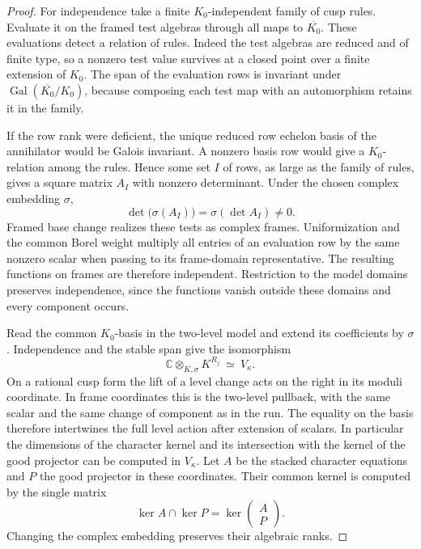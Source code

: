 \begin{proof}
For independence take a finite $K_0$-independent family of
cusp rules. Evaluate it on the framed test algebras through
all maps to $\overline{K_0}$. These evaluations detect a
relation of rules. Indeed the test algebras are reduced
and of finite type, so a nonzero test value survives at
a closed point over a finite extension of $K_0$. The span
of the evaluation rows is invariant under
$\operatorname{Gal}(\overline{K_0}/K_0)$, because composing
each test map with an automorphism retains it in the family.

If the row rank were deficient, the unique reduced row
echelon basis of the annihilator would be Galois invariant.
A nonzero basis row would give a $K_0$-relation among the rules. Hence some set \(I\) of rows, as large as the family of rules, gives a square matrix \(A_I\) with nonzero determinant. Under the chosen complex embedding \(\sigma\),
\[
  \det\big(\sigma(A_I)\big)=\sigma(\det A_I)\ne0 .
\]
 Framed base change realizes these tests
as complex frames. Uniformization and the common Borel
weight multiply all entries of an evaluation row by the
same nonzero scalar when passing to its frame-domain
representative. The resulting functions on frames are therefore independent. Restriction to the model domains preserves independence, since the functions vanish outside these domains and every component occurs.\label{cor:paired-row-reading-2}

Read the common $K_0$-basis in the two-level model and
extend its coefficients by $\sigma$. Independence and the
stable span give the isomorphism
\[
 \mathbb C\otimes_{K,\sigma} K^{R_j}\ \simeq\ V_\kappa .
\]
On a rational cusp form the lift of a level change acts on
the right in its moduli coordinate. In frame coordinates
this is the two-level pullback, with the same scalar and
the same change of component as in the run. The equality
on the basis therefore intertwines the full level action
after extension of scalars. In particular the dimensions
of the character kernel and its intersection with the kernel
of the good projector can be computed in $V_\kappa$.
Let \(A\) be the stacked character equations and \(P\) the good projector in these coordinates. Their common kernel is computed by the single matrix
\[
  \ker A\cap\ker P=\ker\begin{pmatrix}A\\P\end{pmatrix}.
\]
Changing the complex embedding preserves their algebraic
ranks.\label{cor:paired-row-reading-3}


\end{proof}
